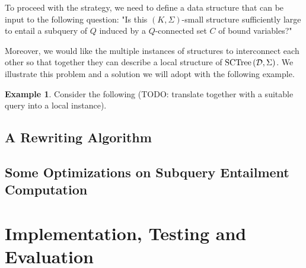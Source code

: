 \documentclass[12pt]{report}
\theoremstyle{plain}
\theoremstyle{definition}
\newtheorem{example}[theorem]{Example}
\newcommand{\SCTree}[2]{\ensuremath{\normalfont{\textrm{SCTree}} \left( #1, #2 \right)}}
\begin{document}
To proceed with the strategy, we need to define a data structure that can be input to the following question: "Is this $(K, \Sigma)$-small structure sufficiently large to entail a subquery of $Q$ induced by a $Q$-connected set $C$ of bound variables?"

Moreover, we would like the multiple instances of structures to interconnect each other so that together they can describe a local structure of $\SCTree{\mathcal{D}}{\Sigma}$. We illustrate this problem and a solution we will adopt with the following example.

\begin{example}
\label{implicit-equality-coding-of-local-names}
  Consider the following (TODO: translate  together with a suitable query into a local instance).
\end{example}


\section{A Rewriting Algorithm}
\label{a-rewriting-algorithm}


\section{Some Optimizations on Subquery Entailment Computation}
\label{secomputation-optimizations}


\newpage
\chapter{Implementation, Testing and Evaluation}

\end{document}
